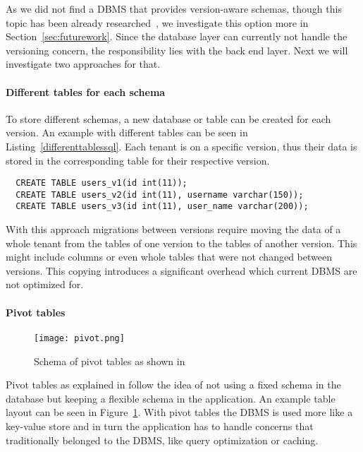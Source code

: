 As we did not find a DBMS that provides version-aware schemas, though this topic has been already researched~\cite{Aulbach2011}, we investigate this option more in Section~\ref{sec:futurework}. Since the database layer can currently not handle the versioning concern, the responsibility lies with the back end layer. Next we will investigate two approaches for that.

\paragraph{Different tables for each schema}

To store different schemas, a new database or table can be created for each version. An example with different tables can be seen in Listing~\ref{differenttablessql}. Each tenant is on a specific version, thus their data is stored in the corresponding table for their respective version.

\lstset{language=SQL, caption=Example SQL code to create queries for supporting three versions of the users table at the same time, label=differenttablessql}
\begin{lstlisting}
  CREATE TABLE users_v1(id int(11));
  CREATE TABLE users_v2(id int(11), username varchar(150));
  CREATE TABLE users_v3(id int(11), user_name varchar(200));
\end{lstlisting}

With this approach migrations between versions require moving the data of a whole tenant from the tables of one version to the tables of another version. This might include columns or even whole tables that were not changed between versions. This copying introduces a significant overhead which current DBMS are not optimized for.

\paragraph{Pivot tables}

\begin{figure}
\centering
\texttt{[image: pivot.png]}
\caption{Schema of pivot tables as shown in \cite{Yaish2011}}
\label{fig:pivot}
\end{figure}

Pivot tables as explained in \cite{Yaish2011} \cite{Aulbach2011} \cite{Weissman2009} follow the idea of not using a fixed schema in the database but keeping a flexible schema in the application. An example table layout can be seen in Figure~\ref{fig:pivot}. With pivot tables the DBMS is used more like a key-value store and in turn the application has to handle concerns that traditionally belonged to the DBMS, like query optimization or caching.

